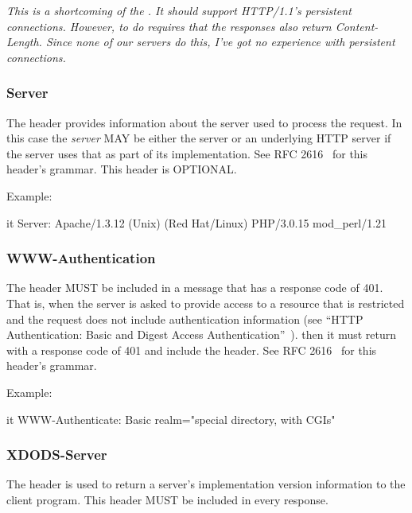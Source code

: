 \documentclass[justify]{dods-paper}
\begin{document}
\emph{This is a shortcoming of the \DAP. It should support HTTP/1.1's
  persistent connections. However, to do requires that the responses
  also return Content-Length. Since none of our servers do this, I've
  got no experience with persistent connections.}

\subsubsection{Server}

The  header provides information about the server used to
process the request. In this case the \emph{server} MAY be either the
\DAP server or an underlying HTTP server if the \DAP server uses
that as part of its implementation. See RFC 2616~\cite{rfc2616}
for this header's grammar. This header is OPTIONAL.

Example:

\begin{vcode}{it}
Server: Apache/1.3.12 (Unix)  (Red Hat/Linux) PHP/3.0.15 mod_perl/1.21
\end{vcode}

\subsubsection{WWW-Authentication}

The  header MUST be included in a message that has a
response code of 401. That is, when the \DAP server is asked to provide
access to a resource that is restricted and the request does not include
authentication information (see ``HTTP Authentication: Basic and Digest
Access Authentication''~\cite{rfc2617}). then it must return with a response
code of 401 and include the  header. See RFC
2616~\cite{rfc2616} for this header's grammar.

Example:

\begin{vcode}{it}
WWW-Authenticate: Basic realm="special directory, with CGIs"
\end{vcode}

\subsubsection{XDODS-Server}

The  header is used to return a \DAP server's
implementation version information to the client program.  This header
MUST be included in every response. 
\end{document}
